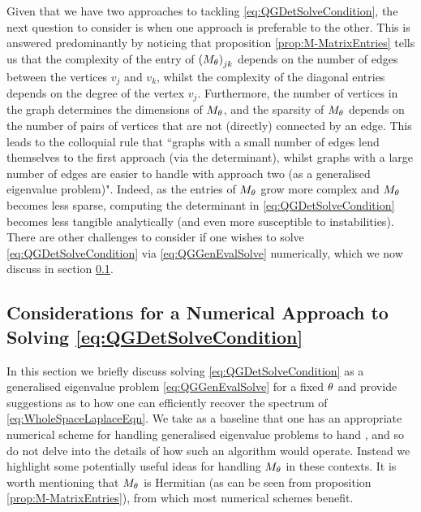 Given that we have two approaches to tackling \eqref{eq:QGDetSolveCondition}, the next question to consider is when one approach is preferable to the other.
This is answered predominantly by noticing that proposition \ref{prop:M-MatrixEntries} tells us that the complexity of the entry of $\left( M_\theta \right)_{jk}$ depends on the number of edges between the vertices $v_j$ and $v_k$, whilst the complexity of the diagonal entries depends on the degree of the vertex $v_j$.
Furthermore, the number of vertices in the graph determines the dimensions of $M_\theta$, and the sparsity of $M_\theta$ depends on the number of pairs of vertices that are not (directly) connected by an edge.
This leads to the colloquial rule that ``graphs with a small number of edges lend themselves to the first approach (via the determinant), whilst graphs with a large number of edges are easier to handle with approach two (as a generalised eigenvalue problem)".
Indeed, as the entries of $M_\theta$ grow more complex and $M_\theta$ becomes less sparse, computing the determinant in \eqref{eq:QGDetSolveCondition} becomes less tangible analytically (and even more susceptible to instabilities).
There are other challenges to consider if one wishes to solve \eqref{eq:QGDetSolveCondition} via \eqref{eq:QGGenEvalSolve} numerically, which we now discuss in section \ref{ssec:NumericalApproachConsiderations}.

\subsection{Considerations for a Numerical Approach to Solving \eqref{eq:QGDetSolveCondition}} \label{ssec:NumericalApproachConsiderations}
In this section we briefly discuss solving \eqref{eq:QGDetSolveCondition} as a generalised eigenvalue problem \eqref{eq:QGGenEvalSolve} for a fixed $\theta$ and provide suggestions as to how one can efficiently recover the spectrum of \eqref{eq:WholeSpaceLaplaceEqn}.
We take as a baseline that one has an appropriate numerical scheme for handling generalised eigenvalue problems to hand , and so do not delve into the details of how such an algorithm would operate.
Instead we highlight some potentially useful ideas for handling $M_\theta$ in these contexts.
It is worth mentioning that $M_\theta$ is Hermitian (as can be seen from proposition \ref{prop:M-MatrixEntries}), from which most numerical schemes benefit.

